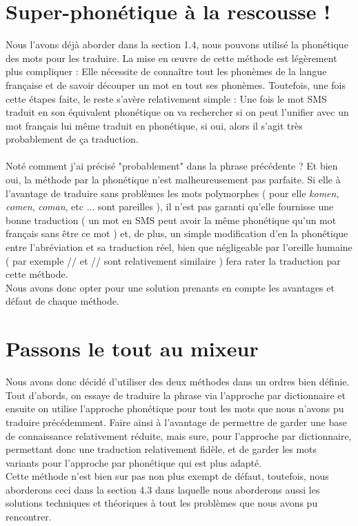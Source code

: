 \documentclass[11pt]{report}
\begin{document}
	\section{Super-phonétique à la rescousse !}
	Nous l'avons déjà aborder dans la section 1.4, nous pouvons utilisé la phonétique des mots pour les traduire.
	La mise en œuvre de cette méthode est légèrement plus compliquer : Elle nécessite de connaître tout les phonèmes de la langue française et de savoir découper un mot en tout ses phonèmes. Toutefois, une fois cette étapes faite, le reste s'avère relativement simple : Une fois le mot SMS traduit en son équivalent phonétique on va rechercher si on peut l'unifier avec un mot français lui même traduit en phonétique, si oui, alors il s'agit très probablement de ça traduction.
	\paragraph{} Noté comment j'ai précisé "probablement" dans la phrase précédente ? Et bien oui, la méthode par la phonétique n'est malheureusement pas parfaite. Si elle à l'avantage de traduire sans problèmes les mots polymorphes ( pour elle {\em komen}, {\em comen}, {\em coman}, etc ... sont pareilles ), il n'est pas garanti qu'elle fournisse une bonne traduction ( un mot en SMS peut avoir la même phonétique qu'un mot français sans être ce mot ) et, de plus, un simple modification d'en la phonétique entre l'abréviation et sa traduction réel, bien que négligeable par l'oreille humaine ( par exemple // et // sont relativement similaire ) fera rater la traduction par cette méthode.\\
	Nous avons donc opter pour une solution prenants en compte les avantages et défaut de chaque méthode.
	
	\section{Passons le tout au mixeur}
	Nous avons donc décidé d'utiliser des deux méthodes dans un ordres bien définie. Tout d'abords, on essaye de traduire la phrase via l'approche par dictionnaire et ensuite on utilise l'approche phonétique pour tout les mots que nous n'avons pu traduire précédemment. Faire ainsi à l'avantage de permettre de garder une base de connaissance relativement réduite, mais sure, pour l'approche par dictionnaire, permettant donc une traduction relativement fidèle, et de garder les mots variants pour l'approche par phonétique qui est plus adapté.\\
	Cette méthode n'est bien sur pas non plus exempt de défaut, toutefois, nous aborderons ceci dans la section 4.3 dans laquelle nous aborderons aussi les solutions techniques et théoriques à tout les problèmes que nous avons pu rencontrer.
\end{document}
